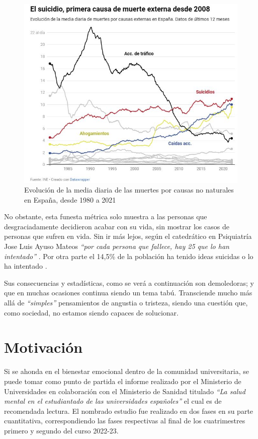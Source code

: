     \begin{figure}[h]
        \centering
        \includegraphics[width=0.85\linewidth]{figures/causas no naturales.jpg}
        \caption[Evolución de la media diaria de las muertes por causas no naturales en España, desde 1980 a 2021]{Evolución de la media diaria de las muertes por causas no naturales en España, desde 1980 a 2021 \cite{sanchez_once_2023}}
        \label{fig:intro:causas_no_naturales}
    \end{figure}

     No obstante, esta funesta métrica solo muestra a las personas que desgraciadamente decidieron acabar con su vida, sin mostrar los casos de personas que sufren en vida. Sin ir más lejos, según el catedrático en Psiquiatría Jose Luis Ayuso Mateos \textit{``por cada persona que fallece, hay 25 que lo han intentado''}  \cite{sanchez_once_2023}.  Por otra parte el 14,5\% de la población ha tenido ideas suicidas o lo ha intentado \cite{comunicacion_cuatro_2023}.

    Sus consecuencias y estadísticas, como se verá a continuación son demoledoras; y que en muchas ocasiones continua siendo un tema tabú. Transciende mucho más allá de \textit{``simples''} pensamientos de angustia o tristeza, siendo una cuestión que, como sociedad, no estamos siendo capaces de solucionar.
    
\section{Motivación}

    Si se ahonda en el bienestar emocional dentro de la comunidad universitaria, se puede tomar como punto de partida el informe realizado por el Ministerio de Universidades en colaboración con el Ministerio de Sanidad titulado \textit{``La salud mental en el estudiantado de las universidades españoles''} \cite{galache_gobierno_2023} \cite{ministerio_de_universidades_salud_2023} el cual es de recomendada lectura. El nombrado estudio fue realizado en dos fases en su parte cuantitativa, correspondiendo las fases respectivas al final de los cuatrimestres primero y segundo del curso 2022-23. 
    
